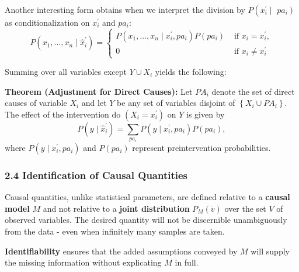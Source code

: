 \documentclass{beamer}
\begin{document}
\begin{frame}
Another interesting form obtains when we interpret the division by $P\left(x_i^{\prime} \mid\right.$ $\left.p a_i\right)$ as conditionalization on $x_i^{\prime}$ and $p a_i$:
$$
P\left(x_1, \ldots, x_n \mid \hat{x}_i^{\prime}\right)= \begin{cases}P\left(x_1, \ldots, x_n \mid x_i^{\prime}, p a_i\right) P\left(p a_i\right) & \text { if } x_i=x_i^{\prime}, \\ 0 & \text { if } x_i \neq x_i^{\prime}\end{cases}
$$

Summing over all variables except $Y \cup X_i$ yields the following:
\vspace{0.2cm}

\textbf{Theorem (Adjustment for Direct Causes):} Let $P A_i$ denote the set of direct causes of variable $X_i$ and let $Y$ be any set of variables disjoint of $\left\{X_i \cup P A_i\right\}$. The effect of the intervention do $\left(X_i=x_i^{\prime}\right)$ on $Y$ is given by
$$
P\left(y \mid \hat{x}_i^{\prime}\right)=\sum_{p a_i} P\left(y \mid x_i^{\prime}, p a_i\right) P\left(p a_i\right),
$$
where $P\left(y \mid x_i^{\prime}, p a_i\right)$ and $P\left(p a_i\right)$ represent preintervention probabilities.
\end{frame}

\begin{frame}
\frametitle{2.4 Identification of Causal Quantities}
Causal quantities, unlike statistical parameters, are defined relative to a \textbf{causal model} $M$ and not relative to a \textbf{joint distribution} $P_M(\dot{v})$ over the set $V$ of observed variables. The desired quantity will not be discernible unambiguously from the data - even when infinitely many samples are taken.

\vspace{0.4cm}
\textbf{Identifiability} ensures that the added assumptions conveyed by $M$ will supply the missing information without explicating $M$ in full.
\end{frame}
\end{document}
